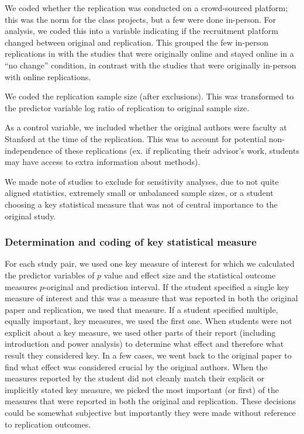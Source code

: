 \documentclass[
  english,
  a4paper,
]{article}
\begin{document}
We coded whether the replication was conducted on a crowd-sourced platform; this was the norm for the class projects, but a few were done in-person. For analysis, we coded this into a variable indicating if the recruitment platform changed between original and replication. This grouped the few in-person replications in with the studies that were originally online and stayed online in a ``no change'' condition, in contrast with the studies that were originally in-person with online replications.

We coded the replication sample size (after exclusions). This was transformed to the predictor variable log ratio of replication to original sample size.

As a control variable, we included whether the original authors were faculty at Stanford at the time of the replication. This was to account for potential non-independence of these replications (ex. if replicating their advisor's work, students may have access to extra information about methods).

We made note of studies to exclude for sensitivity analyses, due to not quite aligned statistics, extremely small or unbalanced sample sizes, or a student choosing a key statistical measure that was not of central importance to the original study.

\subsubsection{Determination and coding of key statistical measure}\label{determination-and-coding-of-key-statistical-measure}

For each study pair, we used one key measure of interest for which we calculated the predictor variables of \(p\) value and effect size and the statistical outcome measures \(p\)-original and prediction interval. If the student specified a single key measure of interest and this was a measure that was reported in both the original paper and replication, we used that measure. If a student specified multiple, equally important, key measures, we used the first one. When students were not explicit about a key measure, we used other parts of their report (including introduction and power analysis) to determine what effect and therefore what result they considered key. In a few cases, we went back to the original paper to find what effect was considered crucial by the original authors. When the measures reported by the student did not cleanly match their explicit or implicitly stated key measure, we picked the most important (or first) of the measures that were reported in both the original and replication. These decisions could be somewhat subjective but importantly they were made without reference to replication outcomes.
\end{document}
